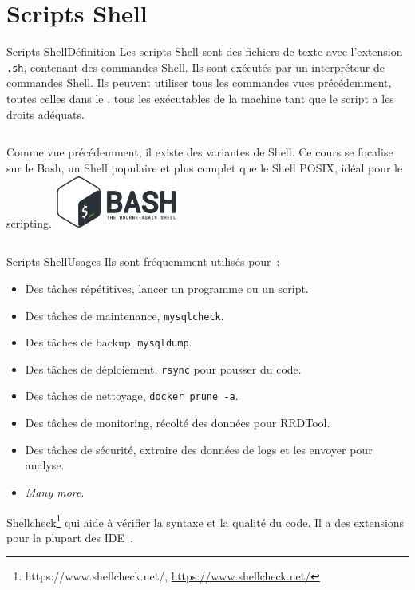 \documentclass{beamer}
\begin{document}
    \section{Scripts Shell}\label{sec:scripting-shell}


    \begin{frame}{Scripts Shell}{Définition}
        Les scripts Shell sont des fichiers de texte avec l'extension \lstinline{.sh}, contenant des commandes Shell.
        Ils sont exécutés par un interpréteur de commandes Shell.
        \bigbreak
        Ils peuvent utiliser tous les commandes vues précédemment, toutes celles dans le , tous les exécutables de la machine tant que le script a les droits adéquats.
        \bigbreak
        \begin{columns}
            Comme vue précédemment, il existe des variantes de Shell.
            Ce cours se focalise sur le Bash, un Shell populaire et plus complet que le Shell POSIX, idéal pour le scripting.
            \centering
            \includegraphics[width=4cm]{image/bash-logo}
        \end{columns}
    \end{frame}

    \begin{frame}{Scripts Shell}{Usages}
        Ils sont fréquemment utilisés pour~:
        \begin{itemize}
            \item Des tâches répétitives, lancer un programme ou un script.
            \item Des tâches de maintenance, \lstinline{mysqlcheck}.
            \item Des tâches de backup, \lstinline{mysqldump}.
            \item Des tâches de déploiement, \lstinline{rsync} pour pousser du code.
            \item Des tâches de nettoyage, \lstinline{docker prune -a}.
            \item Des tâches de monitoring, récolté des données pour RRDTool.
            \item Des tâches de sécurité, extraire des données de logs et les envoyer pour analyse.
            \item \textit{Many more}.
        \end{itemize}
        Shellcheck\footnote{https://www.shellcheck.net/, \url{https://www.shellcheck.net/}} qui aide à vérifier la syntaxe et la qualité du code.
        Il a des extensions pour la plupart des IDE~.
    \end{frame}
\end{document}

